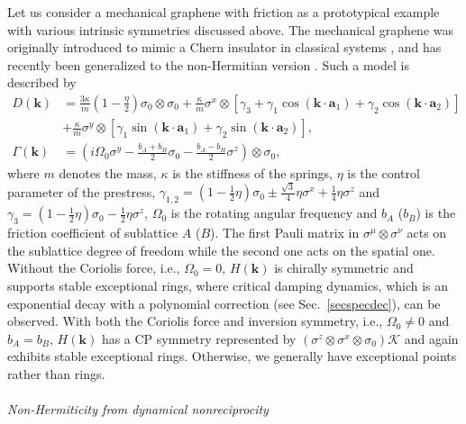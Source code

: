 \documentclass{tADP2e}
\theoremstyle{plain}
\theoremstyle{plain}
\theoremstyle{definition}
\begin{document}
Let us consider a mechanical graphene with friction as a prototypical example with various intrinsic symmetries discussed above. The mechanical graphene was originally introduced to mimic a Chern insulator in classical systems \cite{YTW15,KT15}, and has recently been generalized to the non-Hermitian version \cite{YT19}. Such a model is described by 
\begin{equation}
\begin{split}
D(\boldsymbol{k})&=\frac{3\kappa}{m}\left(1-\frac{\eta}{2}\right)\sigma_0\otimes\sigma_0 +\frac{\kappa}{m}\sigma^x\otimes[\gamma_3+\gamma_1\cos(\boldsymbol{k}\cdot\boldsymbol{a}_1)+\gamma_2\cos(\boldsymbol{k}\cdot\boldsymbol{a}_2)] \\
&+\frac{\kappa}{m}\sigma^y\otimes[\gamma_1\sin(\boldsymbol{k}\cdot\boldsymbol{a}_1)+\gamma_2\sin(\boldsymbol{k}\cdot\boldsymbol{a}_2)], \\
\Gamma(\boldsymbol{k})&=\left(i\Omega_0\sigma^y-\frac{b_A+b_B}{2}\sigma_0-\frac{b_A-b_B}{2}\sigma^z\right)\otimes\sigma_0,
\end{split}
\end{equation}
where $m$ denotes the mass, $\kappa$ is the stiffness of the springs, $\eta$ is the control parameter of the prestress, $\gamma_{1,2}=(1-\frac{1}{2}\eta)\sigma_0\pm\frac{\sqrt{3}}{4}\eta\sigma^x+\frac{1}{4}\eta\sigma^z$ and $\gamma_3=(1-\frac{1}{2}\eta)\sigma_0-\frac{1}{2}\eta\sigma^z$, $\Omega_0$ is the rotating angular frequency and $b_A$ ($b_B$) is the friction coefficient of sublattice $A$ ($B$). 
The first Pauli matrix in $\sigma^\mu\otimes\sigma^\nu$ acts on the sublattice degree of freedom while the second one acts on the spatial one. Without the Coriolis force, i.e., $\Omega_0=0$, $H(\boldsymbol{k})$ is chirally symmetric and supports stable exceptional rings, where critical damping dynamics, which is an exponential decay with a polynomial correction (see Sec.~\ref{secspecdec}), can be observed. 
With both the Coriolis force and inversion symmetry, i.e., $\Omega_0\neq0$ and $b_A=b_B$, $H(\boldsymbol{k})$ has a CP symmetry represented by $(\sigma^z\otimes\sigma^x\otimes\sigma_0)\mathcal{K}$ and again exhibits stable exceptional rings. Otherwise, we generally have exceptional points rather than rings.
\\ \\ {\it Non-Hermiticity from dynamical nonreciprocity}
\end{document}
